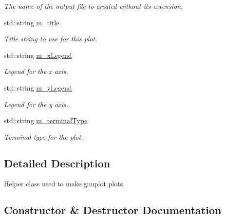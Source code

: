\begin{DoxyCompactItemize}
\begin{DoxyCompactList}\small\item\em The name of the output file to created without its extension. \end{DoxyCompactList}\item 
std\+::string \hyperlink{classns3_1_1GnuplotHelper_a06621b5b7087d9aeddc342fba35f95ca}{m\+\_\+title}
\begin{DoxyCompactList}\small\item\em Title string to use for this plot. \end{DoxyCompactList}\item 
std\+::string \hyperlink{classns3_1_1GnuplotHelper_ae7887c71f49d99acb98f6d4d74ef9178}{m\+\_\+x\+Legend}
\begin{DoxyCompactList}\small\item\em Legend for the x axis. \end{DoxyCompactList}\item 
std\+::string \hyperlink{classns3_1_1GnuplotHelper_ac0c6b6a1cb5e6d165add24d670026ef2}{m\+\_\+y\+Legend}
\begin{DoxyCompactList}\small\item\em Legend for the y axis. \end{DoxyCompactList}\item 
std\+::string \hyperlink{classns3_1_1GnuplotHelper_a9a0989d2b61fd4d10dac8615f7292886}{m\+\_\+terminal\+Type}
\begin{DoxyCompactList}\small\item\em Terminal type for the plot. \end{DoxyCompactList}\end{DoxyCompactItemize}


\subsection{Detailed Description}
Helper class used to make gnuplot plots. 

\subsection{Constructor \& Destructor Documentation}

